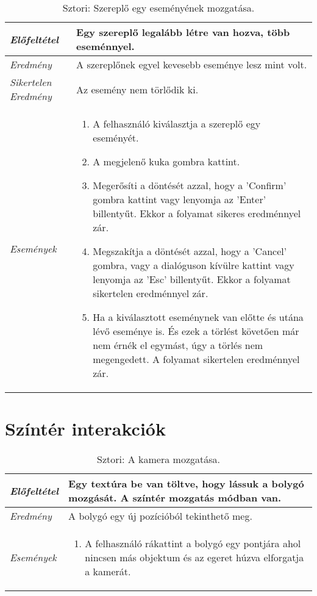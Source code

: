 \begin{table}[H]
	\centering
	\begin{tabular}{ | m{} | m{} | }
		\hline
		\emph{Előfeltétel} & Egy szereplő legalább létre van hozva, több eseménnyel.\\
		\hline
		\emph{Eredmény} & A szereplőnek egyel kevesebb eseménye lesz mint volt. \\
		\hline
		\emph{Sikertelen Eredmény} & Az esemény nem törlődik ki. \\
		\hline
		\hline
		\emph{Események} &
		\begin{enumerate}[itemsep=-1ex]
			\item A felhasználó kiválasztja a szereplő egy eseményét.
			\item A megjelenő kuka gombra kattint.
			\item Megerősíti a döntését azzal, hogy a 'Confirm' gombra kattint vagy lenyomja az 'Enter' billentyűt. Ekkor a folyamat sikeres eredménnyel zár.
			\item  Megszakítja a döntését azzal, hogy a 'Cancel' gombra, vagy a dialóguson kívülre kattint vagy lenyomja az 'Esc' billentyűt. Ekkor a folyamat sikertelen eredménnyel zár.
			\item Ha a kiválasztott eseménynek van előtte és utána lévő eseménye is. És ezek a törlést követően már nem érnék el egymást, úgy a törlés nem megengedett. A folyamat sikertelen eredménnyel zár.
		\end{enumerate}
		\\
		\hline
	\end{tabular}
	\caption{Sztori: Szereplő egy eseményének mozgatása.}
	\label{tab:story-timeline-remove-actor-more-event}
\end{table}

\section{Színtér interakciók}


\begin{table}[H]
	\centering
	\begin{tabular}{ | m{} | m{} | }
		\hline
		\emph{Előfeltétel} & Egy textúra be van töltve, hogy lássuk a bolygó mozgását. A színtér mozgatás módban van. \\
		\hline
		\emph{Eredmény} & A bolygó egy új pozícióból tekinthető meg. \\
		\hline
		\hline
		\emph{Események} &

		\begin{enumerate}[itemsep=-1ex]
			\item A felhasználó rákattint a bolygó egy pontjára ahol nincsen más objektum és az egeret húzva elforgatja a kamerát.
		\end{enumerate}
		\\
		\hline
	\end{tabular}
	\caption{Sztori: A kamera mozgatása.}
	\label{tab:story-planet-pan}
\end{table}


